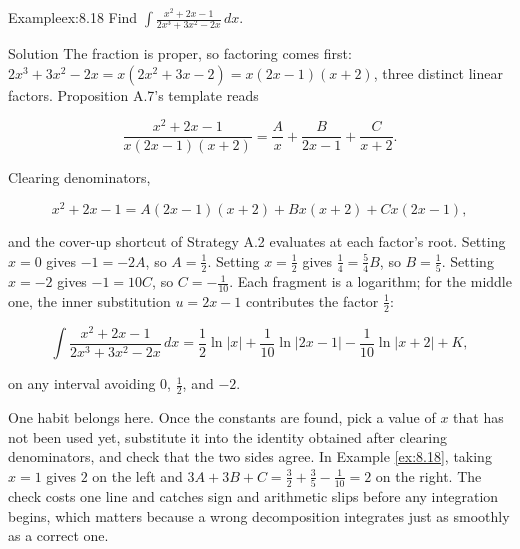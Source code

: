\documentclass[a4paper,12pt,oneside]{memoir}
\begin{document}
\begin{workedexample}
\begin{envexample}{Example}{ex:8.18}{}
Find \(\displaystyle\int \frac{x^{2} + 2x - 1}{2x^{3} + 3x^{2} - 2x}\,dx\).
\end{envexample}
\begin{envsolution}{Solution}{}{}
The fraction is proper, so factoring comes first: \(2x^{3} + 3x^{2} - 2x = x(2x^{2} + 3x - 2) = x(2x - 1)(x + 2)\), three distinct linear factors. Proposition A.7’s template reads

\[ \frac{x^{2} + 2x - 1}{x(2x - 1)(x + 2)} = \frac{A}{x} + \frac{B}{2x - 1} + \frac{C}{x + 2}. \]

Clearing denominators,

\[ x^{2} + 2x - 1 = A(2x - 1)(x + 2) + Bx(x + 2) + Cx(2x - 1), \]

and the cover-up shortcut of Strategy A.2 evaluates at each factor’s root. Setting \(x = 0\) gives \(-1 = -2A\), so \(A = \tfrac{1}{2}\). Setting \(x = \tfrac{1}{2}\) gives \(\tfrac{1}{4} = \tfrac{5}{4}B\), so \(B = \tfrac{1}{5}\). Setting \(x = -2\) gives \(-1 = 10C\), so \(C = -\tfrac{1}{10}\). Each fragment is a logarithm; for the middle one, the inner substitution \(u = 2x - 1\) contributes the factor \(\tfrac{1}{2}\):

\[ \int \frac{x^{2} + 2x - 1}{2x^{3} + 3x^{2} - 2x}\,dx = \frac{1}{2}\ln\lvert x\rvert + \frac{1}{10}\ln\lvert 2x - 1\rvert - \frac{1}{10}\ln\lvert x + 2\rvert + K, \]

on any interval avoiding \(0\), \(\tfrac{1}{2}\), and \(-2\). \qedmark
\end{envsolution}
\end{workedexample}
One habit belongs here. Once the constants are found, pick a value of \(x\) that has not been used yet, substitute it into the identity obtained after clearing denominators, and check that the two sides agree. In Example \ref{ex:8.18}, taking \(x = 1\) gives \(2\) on the left and \(3A + 3B + C = \tfrac{3}{2} + \tfrac{3}{5} - \tfrac{1}{10} = 2\) on the right. The check costs one line and catches sign and arithmetic slips before any integration begins, which matters because a wrong decomposition integrates just as smoothly as a correct one.
\end{document}
